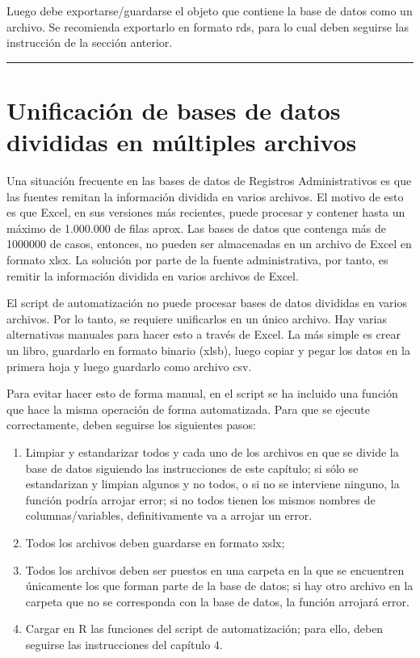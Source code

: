 \documentclass[
  spanish,
]{book}
\begin{document}
Luego debe exportarse/guardarse el objeto que contiene la base de datos como un archivo. Se recomienda exportarlo en formato rds, para lo cual deben seguirse las instrucción de la sección anterior.

\begin{center}\rule{0.5\linewidth}{0.5pt}\end{center}

\hypertarget{unificaciuxf3n-de-bases-de-datos-divididas-en-muxfaltiples-archivos}{%
\section{Unificación de bases de datos divididas en múltiples archivos}\label{unificaciuxf3n-de-bases-de-datos-divididas-en-muxfaltiples-archivos}}

Una situación frecuente en las bases de datos de Registros Administrativos es que las fuentes remitan la información dividida en varios archivos. El motivo de esto es que Excel, en sus versiones más recientes, puede procesar y contener hasta un máximo de 1.000.000 de filas aprox. Las bases de datos que contenga más de 1000000 de casos, entonces, no pueden ser almacenadas en un archivo de Excel en formato xlsx. La solución por parte de la fuente administrativa, por tanto, es remitir la información dividida en varios archivos de Excel.

El script de automatización no puede procesar bases de datos divididas en varios archivos. Por lo tanto, se requiere unificarlos en un único archivo. Hay varias alternativas manuales para hacer esto a través de Excel. La más simple es crear un libro, guardarlo en formato binario (xlsb), luego copiar y pegar los datos en la primera hoja y luego guardarlo como archivo csv.

Para evitar hacer esto de forma manual, en el script se ha incluido una función que hace la misma operación de forma automatizada. Para que se ejecute correctamente, deben seguirse los siguientes pasos:

\begin{enumerate}
\def\labelenumi{\arabic{enumi}.}
\item
  Limpiar y estandarizar todos y cada uno de los archivos en que se divide la base de datos siguiendo las instrucciones de este capítulo; si sólo se estandarizan y limpian algunos y no todos, o si no se interviene ninguno, la función podría arrojar error; si no todos tienen los mismos nombres de columnas/variables, definitivamente va a arrojar un error.
\item
  Todos los archivos deben guardarse en formato xslx;
\item
  Todos los archivos deben ser puestos en una carpeta en la que se encuentren únicamente los que forman parte de la base de datos; si hay otro archivo en la carpeta que no se corresponda con la base de datos, la función arrojará error.
\item
  Cargar en R las funciones del script de automatización; para ello, deben seguirse las instrucciones del capítulo 4.
\end{enumerate}
\end{document}
